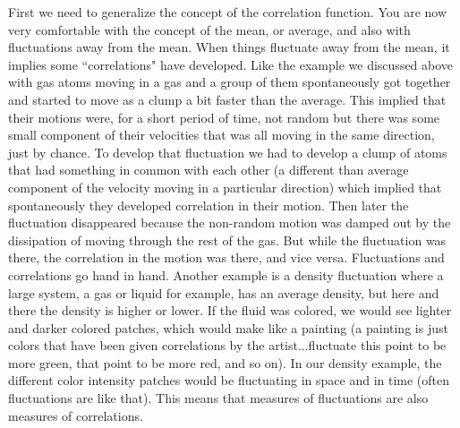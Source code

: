 \documentclass[]{revtex4}
\begin{document}
First we need to generalize the concept of the correlation function.  You are now very comfortable with the concept of the mean, or average,
and also with fluctuations away from the mean.  When things fluctuate away from the mean, it implies some ``correlations" have developed.  Like
the example we discussed above with gas atoms moving in a gas and a group of them spontaneously got together and started to move as a clump a bit
faster than the average.  This implied that their motions were, for a short period of time, not random but there was some small component of their
velocities that was all moving in the same direction, just by chance.   To develop that fluctuation we had to develop a clump of atoms that had
something in common with each other (a different than average component of the velocity moving in a particular direction) which implied that
spontaneously they developed correlation in their motion.  Then later the fluctuation disappeared because the non-random motion was damped out by the
dissipation of moving through the rest of the gas.  But while the fluctuation was there, the correlation in the motion was there, and vice versa.
Fluctuations and correlations go hand in hand.  Another example is a density fluctuation where a large system, a gas or liquid for example, has an
average density, but here and there the density is higher or lower.  If the fluid was colored, we would see lighter and darker colored patches, which
would make like a painting (a painting is  just colors that have been given correlations by the artist...fluctuate this point to be more green, that point
to be more red, and so on).  In our density example, the different color intensity patches would be fluctuating in space and in time
(often fluctuations are like that).  This means that measures of fluctuations are also measures of correlations.
\end{document}
